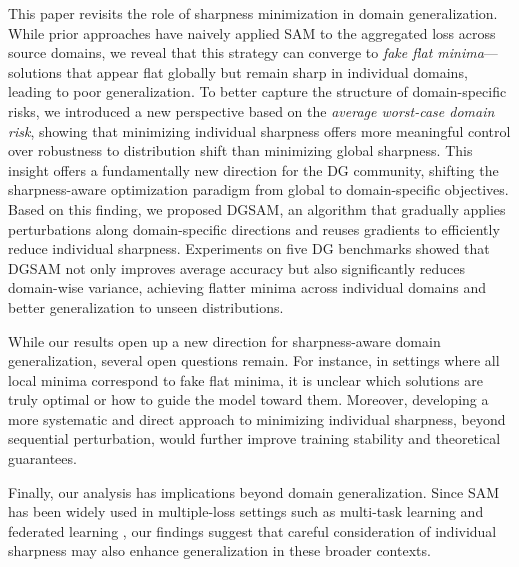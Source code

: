 \documentclass{article}
\theoremstyle{plain}
\theoremstyle{definition}
\theoremstyle{remark}
\begin{document}
This paper revisits the role of sharpness minimization in domain generalization. While prior approaches have naively applied SAM to the aggregated loss across source domains, we reveal that this strategy can converge to \textit{fake flat minima}—solutions that appear flat globally but remain sharp in individual domains, leading to poor generalization. To better capture the structure of domain-specific risks, we introduced a new perspective based on the \textit{average worst-case domain risk}, showing that minimizing individual sharpness offers more meaningful control over robustness to distribution shift than minimizing global sharpness. This insight offers a fundamentally new direction for the DG community, shifting the sharpness-aware optimization paradigm from global to domain-specific objectives. Based on this finding, we proposed DGSAM, an algorithm that gradually applies perturbations along domain-specific directions and reuses gradients to efficiently reduce individual sharpness. Experiments on five DG benchmarks showed that DGSAM not only improves average accuracy but also significantly reduces domain-wise variance, achieving flatter minima across individual domains and better generalization to unseen distributions.

While our results open up a new direction for sharpness-aware domain generalization, several open questions remain. For instance, in settings where all local minima correspond to fake flat minima, it is unclear which solutions are truly optimal or how to guide the model toward them. Moreover, developing a more systematic and direct approach to minimizing individual sharpness, beyond sequential perturbation, would further improve training stability and theoretical guarantees.

Finally, our analysis has implications beyond domain generalization. Since SAM has been widely used in multiple-loss settings such as multi-task learning \cite{le2024sammtl1,phan2022sammtl2} and federated learning \cite{lee2024samfl1, qu2022samfl2, caldarola2022samfl3}, our findings suggest that careful consideration of individual sharpness may also enhance generalization in these broader contexts. 

\end{document}
